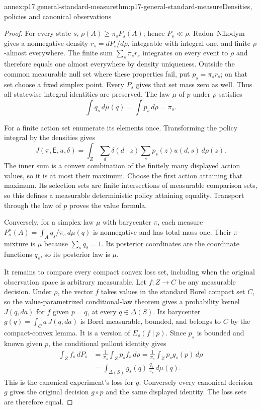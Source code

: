 \begin{annexitem}{annex:p17.general-standard-measure}{thm:p17-general-standard-measure}{Densities, policies and canonical observations}
\begin{proof}
For every state \(s\), \(\rho(A)\geq\pi_sP_s(A)\);
hence \(P_s\ll\rho\). Radon--Nikodym gives a nonnegative density
\(r_s=dP_s/d\rho\), integrable with integral one, and finite
\(\rho\)-almost everywhere. The finite sum
\(\sum_s\pi_sr_s\) integrates on every event to \(\rho\) and
therefore equals one almost everywhere by density uniqueness.
Outside the common measurable null set where these properties fail,
put \(p_s=\pi_sr_s\); on that set choose a fixed simplex point.
Every \(P_s\) gives that set mass zero as well.
Thus all statewise integral identities are preserved.
The law \(\mu\) of \(p\) under \(\rho\) satisfies
\[
                             \int q_s\,d\mu(q)=\int p_s\,d\rho=\pi_s.
\]

For a finite action set enumerate its elements once. Transforming
the policy integral by the densities gives
\[
 J(\pi,\mathsf E,u,\delta)
       =\int_Z\sum_d\delta(d\mid z)
                       \sum_sp_s(z)u(d,s)\,d\rho(z).
\]
The inner sum is a convex combination of the finitely many displayed
action values, so it is at most their maximum.
Choose the first action attaining that maximum. Its selection sets
are finite intersections of measurable comparison sets, so this
defines a measurable deterministic policy attaining equality.
Transport through the law of \(p\) proves the value formula.

Conversely, for a simplex law \(\mu\) with barycenter \(\pi\),
each measure \(P_s^\mu(A)=\int_Aq_s/\pi_s\,d\mu(q)\)
is nonnegative and has total mass one. Their \(\pi\)-mixture is
\(\mu\) because \(\sum_sq_s=1\). Its posterior coordinates are
the coordinate functions \(q_s\), so its posterior law is \(\mu\).

It remains to compare every compact convex loss set, including when
the original observation space is arbitrary measurable.
Let \(f:Z\to C\) be any measurable decision.
Under \(\rho\), the vector \(f\) takes values in the standard Borel
compact set \(C\), so the value-parametrized conditional-law theorem
gives a probability kernel \(J(q,da)\) for \(f\) given \(p=q\),
at every \(q\in\Delta(S)\).
Its barycenter \(g(q)=\int_Ca\,J(q,da)\) is Borel measurable,
bounded, and belongs to \(C\) by the compact-convex lemma.
It is a version of \(E_\rho(f\mid p)\). Since \(p_s\) is bounded
and known given \(p\), the conditional pullout identity gives
\[
 \begin{aligned}
 \int_Z f_s\,dP_s
   &=\frac1{\pi_s}\int_Zp_sf_s\,d\rho
    =\frac1{\pi_s}\int_Zp_sg_s(p)\,d\rho\\
   &=\int_{\Delta(S)}g_s(q)\,\frac{q_s}{\pi_s}\,d\mu(q).
 \end{aligned}
\]
This is the canonical experiment's loss for \(g\).
Conversely every canonical decision \(g\) gives the original
decision \(g\circ p\) and the same displayed identity.
The loss sets are therefore equal.


\end{proof}
\end{annexitem}
